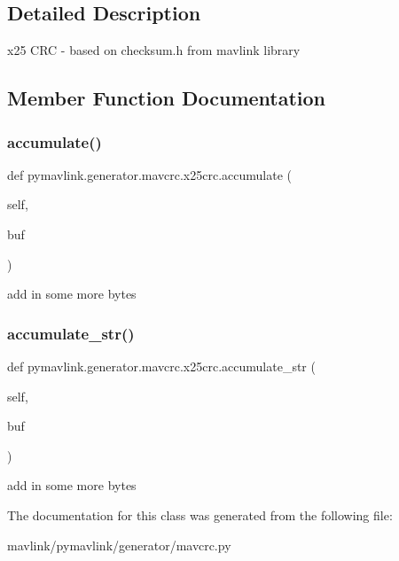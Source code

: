 \subsection{Detailed Description}
\begin{DoxyVerb}x25 CRC - based on checksum.h from mavlink library\end{DoxyVerb}
 

\subsection{Member Function Documentation}
\mbox{\label{classpymavlink_1_1generator_1_1mavcrc_1_1x25crc_ae5f82c53cc694c92a3f612e06e259ae6}} 
\subsubsection{\texorpdfstring{accumulate()}{accumulate()}}
{\footnotesize\ttfamily def pymavlink.\+generator.\+mavcrc.\+x25crc.\+accumulate (\begin{DoxyParamCaption}\item[{}]{self,  }\item[{}]{buf }\end{DoxyParamCaption})}

\begin{DoxyVerb}add in some more bytes\end{DoxyVerb}
 \mbox{\label{classpymavlink_1_1generator_1_1mavcrc_1_1x25crc_a47f2140fb2e08dae2f4315c86f5c2216}} 
\subsubsection{\texorpdfstring{accumulate\+\_\+str()}{accumulate\_str()}}
{\footnotesize\ttfamily def pymavlink.\+generator.\+mavcrc.\+x25crc.\+accumulate\+\_\+str (\begin{DoxyParamCaption}\item[{}]{self,  }\item[{}]{buf }\end{DoxyParamCaption})}

\begin{DoxyVerb}add in some more bytes\end{DoxyVerb}
 

The documentation for this class was generated from the following file\+:\begin{DoxyCompactItemize}
\item 
mavlink/pymavlink/generator/mavcrc.\+py\end{DoxyCompactItemize}
